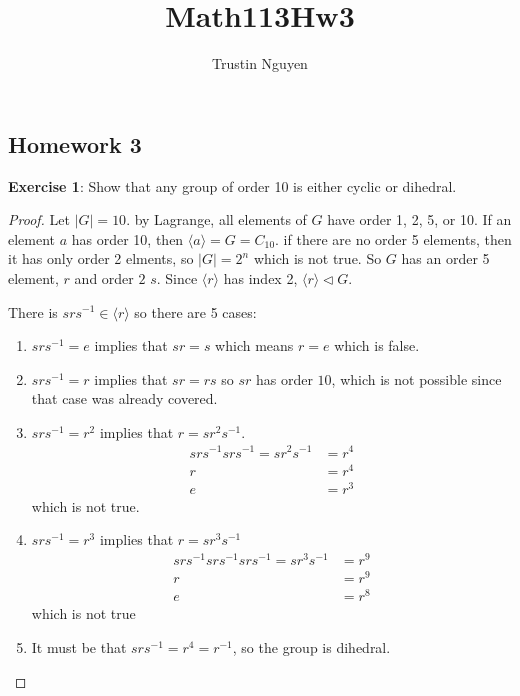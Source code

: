 \documentclass{article}
\title{Math113Hw3}
\author{Trustin Nguyen}
\begin{document}
\maketitle
\reversemarginpar

\begin{topic}
	\section*{Homework 3}
\end{topic}

\textbf{Exercise 1}: Show that any group of order 10 is either cyclic or dihedral.
\begin{proof}
	Let $\lvert G \rvert = 10$. by Lagrange, all elements of $G$ have order 1, 2, 5, or 10. If an element $a$ has order 10, then $\langle a \rangle = G = C_{10}$. if there are no order 5 elements, then it has only order 2 elments, so $\lvert G \rvert = 2^{n}$ which is not true. So $G$ has an order 5 element, $r$ and order $2$ $s$. Since $\langle r \rangle$ has index 2, $\langle r \rangle \triangleleft G$.

	There is $srs^{-1} \in \langle r \rangle$ so there are 5 cases:
	\begin{enumerate}
		\item $srs^{-1} = e$ implies that $sr = s$ which means $r = e$ which is false.

		\item $srs^{-1} = r$ implies that $sr = rs$ so $sr$ has order $10$, which is not possible since that case was already covered.

		\item $srs^{-1} = r^{2}$ implies that $r = sr^{2}s^{-1}$.
			\begin{align*}
				srs^{-1}srs^{-1} = sr^{2}s^{-1} &= r^{4} \\
				r &= r^{4} \\
				e &= r^{3}
			\end{align*}
		which is not true.

		\item $srs^{-1} = r^{3}$ implies that $r = sr^{3}s^{-1}$
			\begin{align*}
				srs^{-1}srs^{-1}srs^{-1} = sr^{3}s^{-1} &= r^{9} \\
				r &= r^{9} \\
				e &= r^{8}
			\end{align*}
		which is not true 

		\item It must be that $srs^{-1} = r^{4} = r^{-1}$, so the group is dihedral.
	\end{enumerate}
\end{proof}
\end{document}
